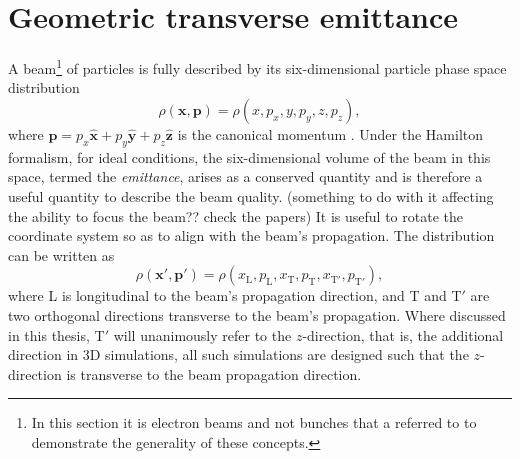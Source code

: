 \section{\label{app:1-basics-transverse_emittance}Geometric transverse emittance}
A beam\footnote{In this section it is electron beams and not bunches that a referred to to demonstrate the generality of these concepts.} of particles is fully described by its six-dimensional particle phase space distribution
\begin{equation}
	\rho(\mathbf{x}, \mathbf{p}) = \rho(x,p_x,y,p_y,z,p_z),
\end{equation}
where $\mathbf{p} = p_x \hat{\mathbf{x}} +  p_y \hat{\mathbf{y}} +  p_z \hat{\mathbf{z}}$ is the canonical momentum \cite{mcdonaldMethodsEmittanceMeasurement1989}. Under the Hamilton formalism, for ideal conditions, the six-dimensional volume of the beam in this space, termed the \textit{emittance}, arises as a conserved quantity and is therefore a useful quantity to describe the beam quality. 
(something to do with it affecting the ability to focus the beam?? check the papers)
It is useful to rotate the coordinate system so as to align with the beam's propagation. The distribution can be written as
\begin{equation}
	\rho(\mathbf{x'}, \mathbf{p'})  = \rho(x_\mathrm{L},p_\mathrm{L},x_\mathrm{T},p_\mathrm{T},x_\mathrm{T'},p_\mathrm{T'}),
\end{equation}
where L is longitudinal to the beam's propagation direction, and T and T$'$ are two orthogonal directions transverse to the beam's propagation. Where discussed in this thesis, T$'$ will unanimously refer to the $z$-direction, that is, the additional direction in 3D simulations, all such simulations are designed such that the $z$-direction is transverse to the beam propagation direction.

